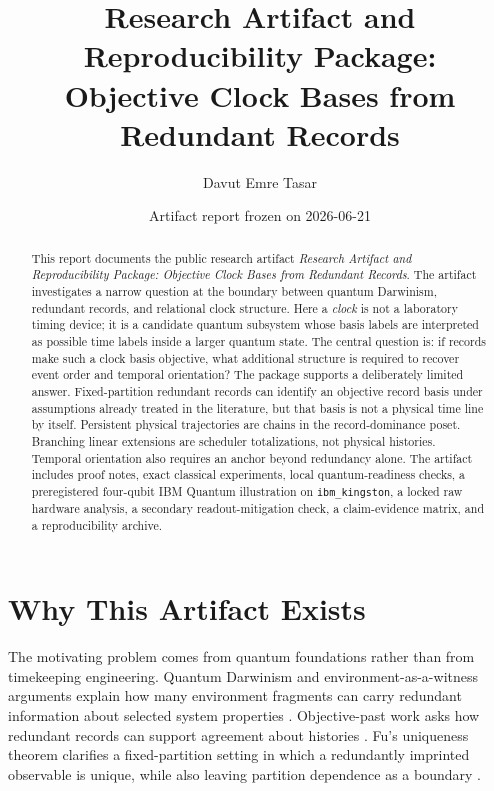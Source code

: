 \documentclass[11pt]{article}
\title{\textbf{Research Artifact and Reproducibility Package:\\
Objective Clock Bases from Redundant Records}}
\author{Davut Emre Tasar}
\date{Artifact report frozen on 2026-06-21}
\newcommand{\artifacttitle}{Research Artifact and Reproducibility Package: Objective Clock Bases from Redundant Records}
\begin{document}
\maketitle

\begin{abstract}
This report documents the public research artifact \emph{\artifacttitle}.
The artifact investigates a narrow question at the boundary between quantum
Darwinism, redundant records, and relational clock structure.  Here a
\emph{clock} is not a laboratory timing device; it is a candidate quantum
subsystem whose basis labels are interpreted as possible time labels inside a
larger quantum state.  The central question is: if records make such a clock
basis objective, what additional structure is required to recover event order
and temporal orientation?  The package supports a deliberately limited answer.
Fixed-partition redundant records can identify an objective record basis under
assumptions already treated in the literature, but that basis is not a physical
time line by itself.  Persistent physical trajectories are chains in the
record-dominance poset.  Branching linear extensions are scheduler
totalizations, not physical histories.  Temporal orientation also requires an
anchor beyond redundancy alone.  The artifact includes proof notes, exact
classical experiments, local quantum-readiness checks, a preregistered
four-qubit IBM Quantum illustration on \texttt{ibm\_kingston}, a locked raw
hardware analysis, a secondary readout-mitigation check, a claim-evidence
matrix, and a reproducibility archive.
\end{abstract}

\tableofcontents

\section{Why This Artifact Exists}

The motivating problem comes from quantum foundations rather than from
timekeeping engineering.  Quantum Darwinism and environment-as-a-witness
arguments explain how many environment fragments can carry redundant
information about selected system properties
\cite{OllivierPoulinZurek2004,BlumeKohoutZurek2006,Zurek2009,Korbicz2021}.
Objective-past work asks how redundant records can support agreement about
histories \cite{RiedelZurekZwolak2016}.  Fu's uniqueness theorem clarifies a
fixed-partition setting in which a redundantly imprinted observable is unique,
while also leaving partition dependence as a boundary \cite{Fu2021}.
\end{document}
